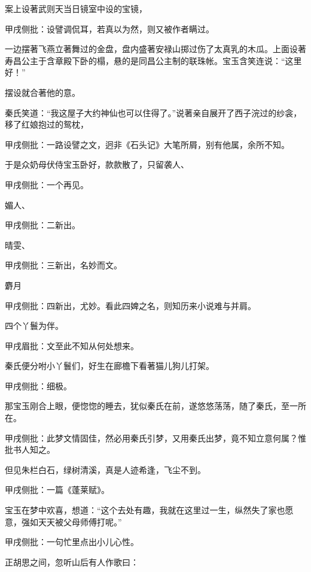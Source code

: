 \begin{parag}
    案上设著武则天当日镜室中设的宝镜，\begin{note}甲戌侧批：设譬调侃耳，若真以为然，则又被作者瞒过。\end{note}一边摆著飞燕立著舞过的金盘，盘内盛著安禄山掷过伤了太真乳的木瓜。上面设著寿昌公主于含章殿下卧的榻，悬的是同昌公主制的联珠帐。宝玉含笑连说：“这里好！”\begin{note}摆设就合著他的意。\end{note}秦氏笑道：“我这屋子大约神仙也可以住得了。”说著亲自展开了西子浣过的纱衾，移了红娘抱过的鸳枕，\begin{note}甲戌侧批：一路设譬之文，迥非《石头记》大笔所屑，别有他属，余所不知。\end{note}于是众奶母伏侍宝玉卧好，款款散了，只留袭人、\begin{note}甲戌侧批：一个再见。\end{note}媚人、\begin{note}甲戌侧批：二新出。\end{note}晴雯、\begin{note}甲戌侧批：三新出，名妙而文。\end{note}麝月\begin{note}甲戌侧批：四新出，尤妙。看此四婢之名，则知历来小说难与并肩。\end{note}四个丫鬟为伴。\begin{note}甲戌眉批：文至此不知从何处想来。\end{note}秦氏便分咐小丫鬟们，好生在廊檐下看著猫儿狗儿打架。\begin{note}甲戌侧批：细极。\end{note}
\end{parag}


\begin{parag}
    那宝玉刚合上眼，便惚惚的睡去，犹似秦氏在前，遂悠悠荡荡，随了秦氏，至一所在。\begin{note}甲戌侧批：此梦文情固佳，然必用秦氏引梦，又用秦氏出梦，竟不知立意何属？惟批书人知之。\end{note}但见朱栏白石，绿树清溪，真是人迹希逢，飞尘不到。\begin{note}甲戌侧批：一篇《蓬莱赋》。\end{note}宝玉在梦中欢喜，想道：“这个去处有趣，我就在这里过一生，纵然失了家也愿意，强如天天被父母师傅打呢。”\begin{note}甲戌侧批：一句忙里点出小儿心性。\end{note}正胡思之间，忽听山后有人作歌曰：
\end{parag}


